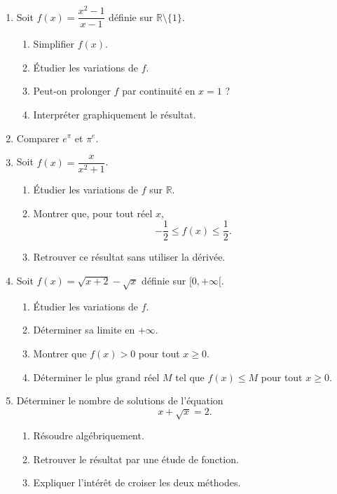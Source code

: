 \documentclass[11pt,a4paper]{article}
\newcommand{\R}{\mathbb{R}}
\begin{document}
\begin{enumerate}[label=\textbf{Exercice \arabic*.}, leftmargin=*, itemsep=1em]

\item Soit \(f(x)=\dfrac{x^2-1}{x-1}\) définie sur \(\R\setminus\{1\}\).

\begin{enumerate}[label=\alph*)]
    \item Simplifier \(f(x)\).
    \item Étudier les variations de \(f\).
    \item Peut-on prolonger \(f\) par continuité en \(x=1\) ?
    \item Interpréter graphiquement le résultat.
\end{enumerate}

\item Comparer \(e^\pi\) et \(\pi^e\).

\item Soit \(f(x)=\dfrac{x}{x^2+1}\).

\begin{enumerate}[label=\alph*)]
    \item Étudier les variations de \(f\) sur \(\R\).
    \item Montrer que, pour tout réel \(x\),
    \[
    -\frac12 \leq f(x)\leq \frac12.
    \]
    \item Retrouver ce résultat sans utiliser la dérivée.
\end{enumerate}

\item Soit \(f(x)=\sqrt{x+2}-\sqrt{x}\) définie sur \([0,+\infty[\).

\begin{enumerate}[label=\alph*)]
    \item Étudier les variations de \(f\).
    \item Déterminer sa limite en \(+\infty\).
    \item Montrer que \(f(x)>0\) pour tout \(x\geq 0\).
    \item Déterminer le plus grand réel \(M\) tel que \(f(x)\leq M\) pour tout \(x\geq 0\).
\end{enumerate}

\item Déterminer le nombre de solutions de l'équation
\[
x+\sqrt{x}=2.
\]

\begin{enumerate}[label=\alph*)]
    \item Résoudre algébriquement.
    \item Retrouver le résultat par une étude de fonction.
    \item Expliquer l'intérêt de croiser les deux méthodes.
\end{enumerate}

\end{enumerate}
\end{document}
